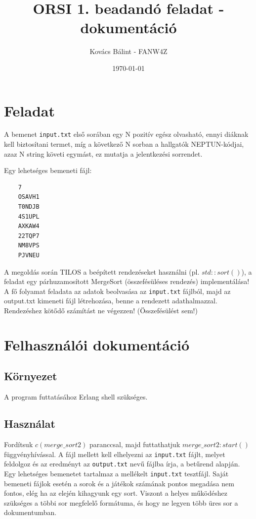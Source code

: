 \documentclass{article}
\begin{document}
	
	
	\title{ORSI 1. beadandó feladat - dokumentáció} 
	\author{Kovács Bálint - FANW4Z}  %
	\date{\today}  %
	\maketitle
	
	\section{Feladat}
	A bemenet \texttt{input.txt} első sorában egy N pozitív egész olvasható, ennyi diáknak kell biztosítani termet, míg a következő N sorban a hallgatók NEPTUN-kódjai, azaz N string követi egymást, ez mutatja a jelentkezési sorrendet.
	
	Egy lehetséges bemeneti fájl:
	\begin{verbatim}
	7
	OSAVH1
	T0NDJB
	4S1UPL
	AXKAW4
	22TQP7
	NM8VPS
	PJVNEU
	\end{verbatim}
	
	A megoldás során TILOS a beépített rendezéseket használni (pl. \(std::sort()\)), a feladat egy párhuzamosított MergeSort (összefésüléses rendezés) implementálása! A fő folyamat feladata az adatok beolvasása az \texttt{input.txt} fájlból, majd az output.txt kimeneti fájl létrehozása, benne a rendezett adathalmazzal. Rendezéshez kötődő számítást ne végezzen! (Összefésülést sem!)

	
	\section{Felhasználói dokumentáció}
	
	\subsection{Környezet}
	A program futtatásához Erlang shell szükséges. 
	
	\subsection{Használat}
	Fordítsuk \(c(merge\_sort2)\) paranccsal, majd futtathatjuk \(merge\_sort2:start()\) függvényhívással. A fájl mellett kell elhelyezni az \texttt{input.txt} fájlt, melyet feldolgoz és az eredményt az \texttt{output.txt} nevű fájlba írja, a betűrend  alapján. Egy lehetséges bemenetet tartalmaz a mellékelt \texttt{input.txt} tesztfájl. Saját bemeneti fájlok esetén a sorok és a játékok számának pontos megadása nem fontos, elég ha az elején kihagyunk egy sort. Viszont  a helyes működéshez szükséges a többi sor megfelelő formátuma, és hogy ne legyen több üres sor a dokumentumban.
	
\end{document}
